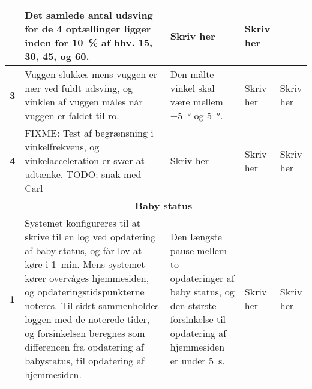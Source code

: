 \begin{center}
\begin{longtable}{|p{}|p{}|p{}|p{}|p{}|}
			&Det samlede antal udsving for de 4 optællinger ligger inden for \SI{10}{\percent} af hhv. 15, 30, 45, og 60.
			
			&Skriv her
			&Skriv her
			\\\hline


\textbf{3}  &Vuggen slukkes mens vuggen er nær ved fuldt udsving, og vinklen af vuggen måles når vuggen er faldet til ro. 
			&Den målte vinkel skal være mellem \SI{-5}{\degree} og \SI{5}{\degree}.
			&Skriv her
			&Skriv her
			\\ \hline


\textbf{4}  &FIXME: Test af begrænsning i vinkelfrekvens, og vinkelacceleration er svær at udtænke. TODO: snak med Carl
			&Skriv her
			&Skriv her
			&Skriv her
			\\ \hline
			
			
&\multicolumn{4}{|c|}{\textbf{Baby status}} \\ \hline

\textbf{1}  &Systemet konfigureres til at skrive til en log ved opdatering af baby status, og får lov at køre i \SI{1}{\minute}. Mens systemet kører overvåges hjemmesiden, og opdateringstidspunkterne noteres. Til sidst sammenholdes loggen med de noterede tider, og forsinkelsen beregnes som differencen fra opdatering af babystatus, til opdatering af hjemmesiden.
			&Den længste pause mellem to opdateringer af baby status, og den største forsinkelse til opdatering af hjemmesiden er under \SI{5}{\second}.
			&Skriv her
			&Skriv her
			\\ \hline
			
\end{longtable}
\end{center}


